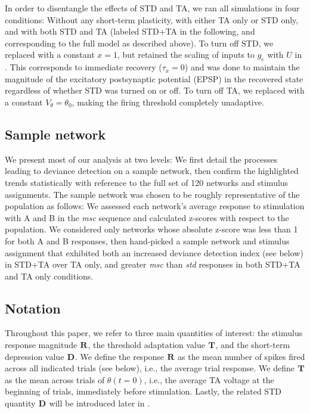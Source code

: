 \documentclass[9pt,lineno,onehalfspacing]{elife}
\newcommand{\msc}{\textit{msc}}
\newcommand{\std}{\textit{std}}
\newcommand{\R}[3][]{{}^{#1}_{}\boldsymbol R^{#2}_{#3}}
\newcommand{\T}[3][]{{}^{#1}_{}\boldsymbol T^{#2}_{#3}}
\newcommand{\D}[3][]{{}^{#1}_{}\boldsymbol D^{#2}_{#3}}
\begin{document}
In order to disentangle the effects of STD and TA, we ran all simulations in four conditions: Without any short-term plasticity, with either TA only or STD only, and with both STD and TA (labeled STD+TA in the following, and corresponding to the full model as described above). To turn off STD, we replaced  with a constant $x = 1$, but retained the scaling of inputs to $g_e$ with $U$ in . This corresponds to immediate recovery ($\tau_x = 0$) and was done to maintain the magnitude of the excitatory postsynaptic potential (EPSP) in the recovered state regardless of whether STD was turned on or off. To turn off TA, we replaced  with a constant $V_{\theta} = \theta_0$, making the firing threshold completely unadaptive.

\subsection{Sample network}\label{sec:sample}

We present most of our analysis at two levels: We first detail the processes leading to deviance detection on a sample network, then confirm the highlighted trends statistically with reference to the full set of 120 networks and stimulus assignments. The sample network was chosen to be roughly representative of the population as follows: We assessed each network's average response to stimulation with A and B in the \msc{} sequence and calculated z-scores with respect to the population. We considered only networks whose absolute z-score was less than 1 for both A and B responses, then hand-picked a sample network and stimulus assignment that exhibited both an increased deviance detection index (see  below) in STD+TA over TA only, and greater \msc{} than \std{} responses in both STD+TA and TA only conditions.

\subsection{Notation}\label{sec:notation}

Throughout this paper, we refer to three main quantities of interest: the stimulus response magnitude $\R{}{}$, the threshold adaptation value $\T{}{}$, and the short-term depression value $\D{}{}$. We define the response $\R{}{}$ as the mean number of spikes fired across all indicated trials (see below), i.e., the average trial response. We define $\T{}{}$ as the mean across trials of $\theta(t=0)$, i.e., the average TA voltage at the beginning of trials, immediately before stimulation. Lastly, the related STD quantity $\D{}{}$ will be introduced later in .
\end{document}

